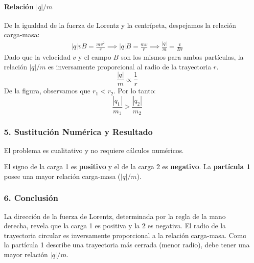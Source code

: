 \paragraph*{Relación $|q|/m$}
De la igualdad de la fuerza de Lorentz y la centrípeta, despejamos la relación carga-masa:
\begin{gather}
    |q|vB = \frac{mv^2}{r} \implies |q|B = \frac{mv}{r} \implies \frac{|q|}{m} = \frac{v}{Br}
\end{gather}
Dado que la velocidad $v$ y el campo $B$ son los mismos para ambas partículas, la relación $|q|/m$ es inversamente proporcional al radio de la trayectoria $r$.
$$ \frac{|q|}{m} \propto \frac{1}{r} $$
De la figura, observamos que $r_1 < r_2$. Por lo tanto:
$$ \frac{|q_1|}{m_1} > \frac{|q_2|}{m_2} $$

\subsubsection*{5. Sustitución Numérica y Resultado}
El problema es cualitativo y no requiere cálculos numéricos.
\begin{cajaresultado}
El signo de la carga 1 es \textbf{positivo} y el de la carga 2 es \textbf{negativo}.
La \textbf{partícula 1} posee una mayor relación carga-masa ($|q|/m$).
\end{cajaresultado}

\subsubsection*{6. Conclusión}
\begin{cajaconclusion}
La dirección de la fuerza de Lorentz, determinada por la regla de la mano derecha, revela que la carga 1 es positiva y la 2 es negativa. El radio de la trayectoria circular es inversamente proporcional a la relación carga-masa. Como la partícula 1 describe una trayectoria más cerrada (menor radio), debe tener una mayor relación $|q|/m$.
\end{cajaconclusion}

\newpage
